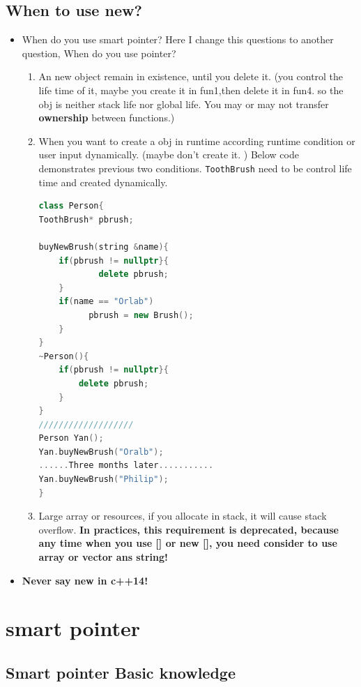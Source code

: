 \documentclass[a4paper,12pt,twoside]{book}
\begin{document}
\subsection{When to use new?}
\begin{itemize}

\item When do you use smart pointer? Here I change this questions to another question, When do you use pointer?
\begin{enumerate}

\item An new object remain in existence, until you delete it. (you control the life time of it, maybe you create it in fun1,then delete it in fun4. so the obj is neither stack life nor global life. You may or may not transfer \textbf{ownership} between functions.)

\item When you want to create a obj in runtime according runtime condition or user input dynamically. (maybe don't create it. ) Below code demonstrates previous two conditions.  \texttt{ToothBrush} need to be control life time and created dynamically.

\begin{lstlisting}[frame=single, language=c++]
class Person{
ToothBrush* pbrush;

buyNewBrush(string &name){
    if(pbrush != nullptr}{
	    	delete pbrush;
    }
    if(name == "Orlab")
          pbrush = new Brush();
    }
}
~Person(){
	if(pbrush != nullptr}{
		delete pbrush;
    }
}
///////////////////
Person Yan();
Yan.buyNewBrush("Oralb");
......Three months later...........
Yan.buyNewBrush("Philip");
}
\end{lstlisting}

\item Large array or resources,  if you allocate in stack, it will cause stack overflow. \textbf{In practices, this requirement is deprecated, because any time when you use [] or new [], you need consider to use array or vector ans string!}
\end{enumerate}

\item \textbf{Never say new in c++14!} 
\end{itemize}

\section{smart pointer}

\subsection{Smart pointer Basic knowledge}
\end{document}

